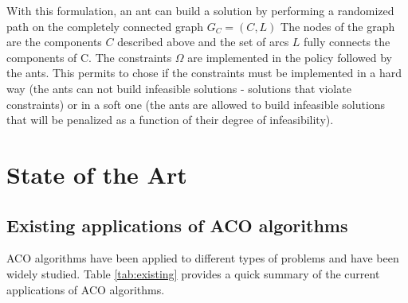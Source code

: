 With this formulation, an ant can build a solution by performing a randomized path on the completely connected graph $G_C = (C,L)$ The nodes of the graph are the components $C$ described above and the set of arcs $L$ fully connects the components of C. The constraints $\Omega$ are implemented in the policy followed by the ants. This permits to chose if the constraints must be implemented in a hard way (the ants can not build infeasible solutions - solutions that violate constraints) or in a soft one (the ants are allowed to build infeasible solutions that will be penalized as a function of their degree of infeasibility).

\section{State of the Art}\label{state}
\subsection{Existing applications of ACO algorithms}\label{existing}
ACO algorithms have been applied to different types of problems and have been widely studied. Table \ref{tab:existing} provides a quick summary of the current applications of ACO algorithms. 

